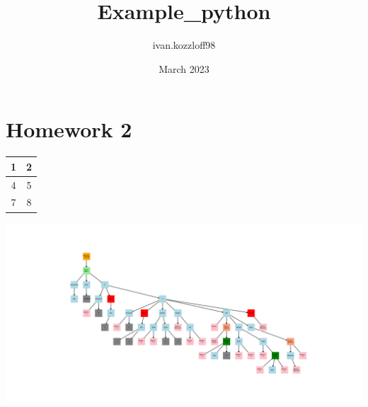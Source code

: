\documentclass{article}
\title{Example_python}
\author{ivan.kozzloff98 }
\date{March 2023}
\begin{document}
\section{Homework 2}
\begin{tabular}{c | c}
\hline
1 & 2 \\
\hline
4 & 5 \\
\hline
7 & 8 \\
\hline
\end{tabular}
\newline 
\includegraphics[scale=0.8]{ast_tree.png}\newline 
\end{document}
